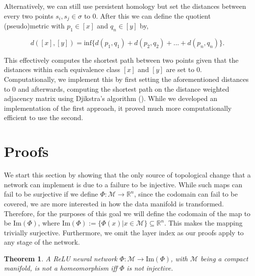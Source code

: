 \documentclass[10pt]{article} %
\theoremstyle{plain}
\newtheorem{theorem}{Theorem}[section]
\theoremstyle{definition}
\theoremstyle{remark}
\begin{document}
Alternatively, we can still use persistent homology but set the distances between every two points $s_i, s_j \in \sigma$ to 0. After this we can define the quotient (pseudo)metric with $p_1 \in [x]$ and $q_n \in [y]$ by,

\begin{equation*}
    d([x],[y]) = \text{inf}\{d(p_1,q_1) + d(p_2,q_2)+...+d(p_n,q_n)\}.
\end{equation*}

This effectively computes the shortest path between two points given that the distances within each equivalence class $[x]$ and $[y]$ are set to 0. Computationally, we implement this by first setting the aforementioned distances to 0 and afterwards, computing the shortest path on the distance weighted adjacency matrix using Djikstra's algorithm (\cite{dijkstra1959note}). While we developed an implementation of the first approach, it proved much more computationally efficient to use the second.

\newpage

\section{Proofs}

We start this section by showing that the only source of topological change that a network can implement is due to a failure to be injective. While such maps can fail to be surjective if we define $\Phi:\mathcal{M} \to \mathbb{R}^n$, since the codomain can fail to be covered, we are more interested in how the data manifold is transformed. Therefore, for the purposes of this goal we will define the codomain of the map to be $\text{Im}(\Phi)$, where $\text{Im}(\Phi) := \{\Phi(x)|x\in \mathcal{M}\} \subseteq \mathbb{R}^n$. This makes the mapping trivially surjective. Furthermore, we omit the layer index as our proofs apply to any stage of the network.

\begin{theorem}
    A ReLU neural network $\Phi: \mathcal{M} \to \text{Im}(\Phi)$, with $\mathcal{M}$ being a compact manifold, is not a homeomorphism iff $\Phi$ is not injective.
\end{theorem}
\end{document}
